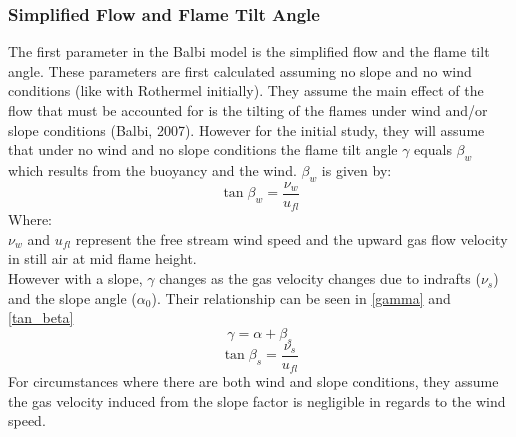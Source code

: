 \documentclass{article}
\begin{document}
\subsubsection{Simplified Flow and Flame Tilt Angle}
\indent The first parameter in the Balbi model is the simplified flow and the flame tilt angle. These parameters are first calculated assuming no slope and no wind conditions (like with Rothermel initially). They assume the main effect of the flow that must be accounted for is the tilting of the flames under wind and/or slope conditions (Balbi, 2007). However for the initial study, they will assume that under no wind and no slope conditions the flame tilt angle $\gamma$ equals $\beta _ w$ which results from the buoyancy and the wind. $\beta _w$ is given by:
\begin{equation}
	\label{beta_w}
	\tan \beta _ w = \frac {\nu _ w} {u_{fl}}
\end{equation}
Where:\\
 $\nu _ w$ and $u_{fl}$ represent the free stream wind speed and the upward gas flow velocity in still air at mid flame height. \\
\indent However with a slope, $\gamma$ changes as the gas velocity changes due to indrafts ($\nu _ s$) and the slope angle ($\alpha _0$). Their relationship can be seen in \ref{gamma} and \ref{tan_beta}
\begin{equation}
	\label{gamma}
	\gamma = \alpha + \beta _ s
\end{equation}
\begin{equation}
	\label{tan_beta}
	\tan \beta _ s = \frac {\nu _ s} {u_{fl}}
\end{equation}
\indent For circumstances where there are both wind and slope conditions, they assume the gas velocity induced from the slope factor is negligible in regards to the wind speed.
\end{document}
